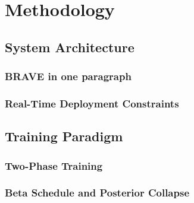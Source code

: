 \chapter{Methodology}
\label{ch:methodology}

\section{System Architecture}
\label{sec:method_arch}


\subsection{BRAVE in one paragraph}

\subsection{Real-Time Deployment Constraints}

\section{Training Paradigm}
\label{sec:method_training}

\subsection{Two-Phase Training}

\subsection{Beta Schedule and Posterior Collapse}

